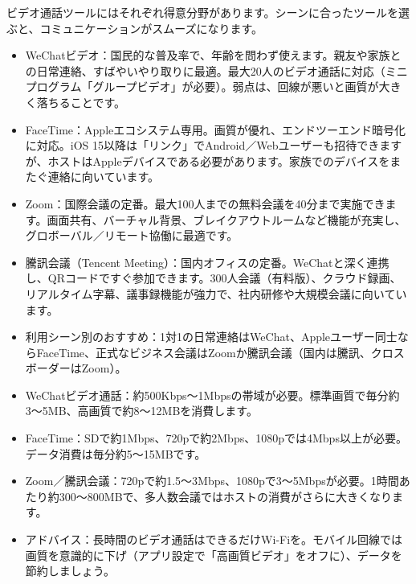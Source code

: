 
ビデオ通話ツールにはそれぞれ得意分野があります。シーンに合ったツールを選ぶと、コミュニケーションがスムーズになります。

\begin{itemize}
  \item WeChatビデオ：国民的な普及率で、年齢を問わず使えます。親友や家族との日常連絡、すばやいやり取りに最適。最大20人のビデオ通話に対応（ミニプログラム「グループビデオ」が必要）。弱点は、回線が悪いと画質が大きく落ちることです。
  \item FaceTime：Appleエコシステム専用。画質が優れ、エンドツーエンド暗号化に対応。iOS 15以降は「リンク」でAndroid／Webユーザーも招待できますが、ホストはAppleデバイスである必要があります。家族でのデバイスをまたぐ連絡に向いています。
  \item Zoom：国際会議の定番。最大100人までの無料会議を40分まで実施できます。画面共有、バーチャル背景、ブレイクアウトルームなど機能が充実し、グロボーバル／リモート協働に最適です。
  \item 騰訊会議（Tencent Meeting）：国内オフィスの定番。WeChatと深く連携し、QRコードですぐ参加できます。300人会議（有料版）、クラウド録画、リアルタイム字幕、議事録機能が強力で、社内研修や大規模会議に向いています。
  \item 利用シーン別のおすすめ：1対1の日常連絡はWeChat、Appleユーザー同士ならFaceTime、正式なビジネス会議はZoomか騰訊会議（国内は騰訊、クロスボーダーはZoom）。
\end{itemize}


\begin{itemize}
  \item WeChatビデオ通話：約500Kbps〜1Mbpsの帯域が必要。標準画質で毎分約3〜5MB、高画質で約8〜12MBを消費します。
  \item FaceTime：SDで約1Mbps、720pで約2Mbps、1080pでは4Mbps以上が必要。データ消費は毎分約5〜15MBです。
  \item Zoom／騰訊会議：720pで約1.5〜3Mbps、1080pで3〜5Mbpsが必要。1時間あたり約300〜800MBで、多人数会議ではホストの消費がさらに大きくなります。
  \item アドバイス：長時間のビデオ通話はできるだけWi-Fiを。モバイル回線では画質を意識的に下げ（アプリ設定で「高画質ビデオ」をオフに）、データを節約しましょう。
\end{itemize}


